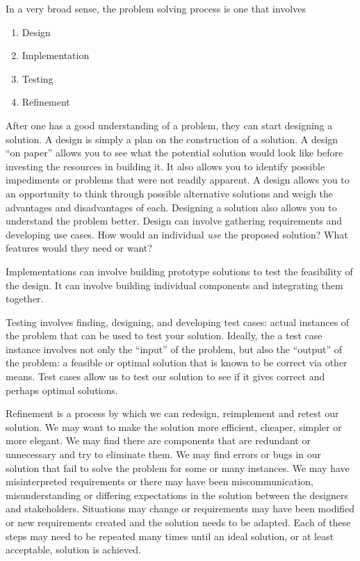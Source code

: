 In a very broad sense, the problem solving process is one that involves
\begin{enumerate}
  \item Design
  \item Implementation
  \item Testing
  \item Refinement
\end{enumerate}

After one has a good understanding of a problem, they can start designing
a solution.  A design is simply a plan on the construction of a solution.  A
design ``on paper'' allows you to see what the potential solution would look
like before investing the resources in building it.  It also allows you to identify
possible impediments or problems that were not readily apparent.  A
design allows you to an opportunity to think through possible alternative
solutions and weigh the advantages and disadvantages of each.  
Designing a solution also allows you to understand the problem better.
Design can involve gathering requirements and developing 
 use cases.  
How would an individual \emph{use} the proposed solution?  What features
would they need or want?  

Implementations can involve building prototype solutions to test the
feasibility of the design.  It can involve building individual components and
integrating them together.

Testing  involves finding, designing, and developing test cases: actual
instances of the problem that can be used to test your solution.  Ideally, the
a test case instance involves not only the ``input'' of the problem, but also
the ``output'' of the problem: a feasible or optimal solution that is known
to be correct via other means.  Test cases allow us to test our solution to
see if it gives correct and perhaps optimal solutions.  

Refinement is a process by which we can redesign, reimplement and
retest our solution.  We may want to make the solution more efficient, 
cheaper, simpler or more elegant.  We may find there are components
that are redundant or unnecessary and try to eliminate them.  We
may find errors or bugs in our solution that fail to solve the problem 
for some or many instances.  We may have misinterpreted requirements
or there may have been miscommunication, misunderstanding or
differing expectations in the solution between the designers and 
stakeholders.  Situations may change or requirements may have
been modified or new requirements created and the solution needs
to be adapted.  Each of these steps may need to be repeated many
times until an ideal solution, or at least acceptable, solution is achieved.

